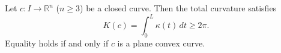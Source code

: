 Let $c: I \to \mathbb{R}^n$ ($n \geq 3$) be a closed curve. Then the total curvature satisfies
$$K(c) = \int_0^L \kappa(t)\,dt \geq 2\pi.$$
Equality holds if and only if $c$ is a plane convex curve.